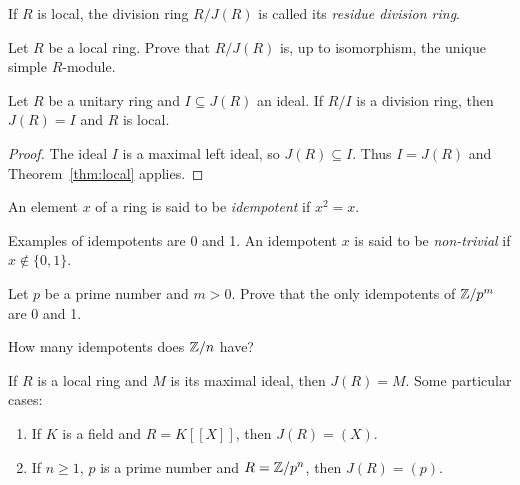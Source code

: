 If $R$ is local, the division ring $R/J(R)$ is called its
\emph{residue division ring}.

\begin{exercise}
    \label{xca:local_simple}
    Let $R$ be a local ring. Prove that $R/J(R)$ is, up to isomorphism,
    the unique simple $R$-module.
\end{exercise}


\begin{proposition}
    \label{pro:local_quotient}
    Let $R$ be a unitary ring and $I\subseteq J(R)$ an ideal.
    If $R/I$ is a division ring, then $J(R)=I$ and $R$ is local.
\end{proposition}

\begin{proof}
    The ideal $I$ is a maximal left ideal, so $J(R)\subseteq I$.
    Thus $I=J(R)$ and Theorem~\ref{thm:local} applies.
\end{proof}



\begin{definition}
    An element $x$ of a ring is said to be \emph{idempotent} 
    if $x^2=x$.   
\end{definition}

Examples of idempotents are 0 and 1. 
An idempotent $x$ is said to be \emph{non-trivial} if $x\not\in\{0,1\}$. 

\begin{exercise}
\label{xca:idempotents_modpm}
    Let $p$ be a prime number and $m>0$. 
    Prove that the only idempotents of $\mathbb{Z}/p^m$ are 0 and 1. 
\end{exercise}


\begin{exercise}
    \label{xca:idempotents_modn}
    How many idempotents does $\mathbb{Z}/n$ have?
\end{exercise}

\begin{example}
	If $R$ is a local ring and $M$ is its maximal ideal, then $J(R)=M$. Some particular cases: 
	\begin{enumerate}
		\item If $K$ is a field and $R=K[\![X]\!]$, then $J(R)=(X)$. 
		\item If $n\geq1$, $p$ is a prime number and $R=\mathbb{Z}/p^n$, then $J(R)=(p)$. 
	\end{enumerate}
\end{example}

